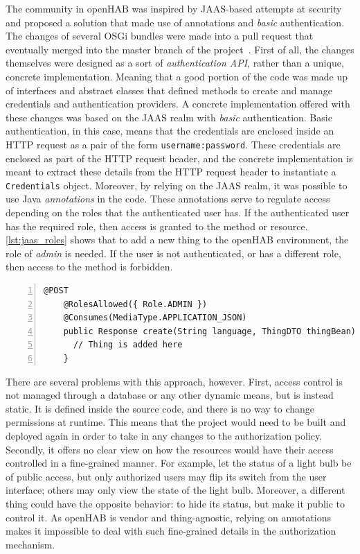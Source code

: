 \documentclass[12pt]{article}
\begin{document}
The community in openHAB was inspired by JAAS-based attempts at security and proposed a solution that made use of annotations and \emph{basic} authentication. The changes of several OSGi bundles were made into a pull request that eventually merged into the master branch of the project~\cite{esh_04}. First of all, the changes themselves were designed as a sort of \emph{authentication API}, rather than a unique, concrete implementation. Meaning that a good portion of the code was made up of interfaces and abstract classes that defined methods to create and manage credentials and authentication providers. A concrete implementation offered with these changes was based on the JAAS realm with \emph{basic} authentication. Basic authentication, in this case, means that the credentials are enclosed inside an HTTP request as a pair of the form \texttt{username:password}. These credentials are enclosed as part of the HTTP request header, and the concrete implementation is meant to extract these details from the HTTP request header to instantiate a \texttt{Credentials} object. Moreover, by relying on the JAAS realm, it was possible to use Java \emph{annotations} in the code. These annotations serve to regulate access depending on the roles that the authenticated user has. If the authenticated user has the required role, then access is granted to the method or resource. \autoref{lst:jaas_roles} shows that to add a new thing to the openHAB environment, the role of \emph{admin} is needed. If the user is not authenticated, or has a different role, then access to the method is forbidden. 


\begin{lstlisting}[caption={Role-Based method restriction in ESH.},label={lst:jaas_roles},numbers=left]
    @POST
    @RolesAllowed({ Role.ADMIN })
    @Consumes(MediaType.APPLICATION_JSON)
    public Response create(String language, ThingDTO thingBean) {
      // Thing is added here
    }
\end{lstlisting}

There are several problems with this approach, however. First, access control is not managed through a database or any other dynamic means, but is instead static. It is defined inside the source code, and there is no way to change permissions at runtime. This means that the project would need to be built and deployed again in order to take in any changes to the authorization policy. Secondly, it offers no clear view on how the resources would have their access controlled in a fine-grained manner. For example, let the status of a light bulb be of public access, but only authorized users may flip its switch from the user interface; others may only view the state of the light bulb. Moreover, a different thing could have the opposite behavior: to hide its status, but make it public to control it. As openHAB is vendor and thing-agnostic, relying on annotations makes it impossible to deal with such fine-grained details in the authorization mechanism.
\end{document}
